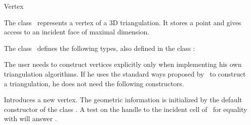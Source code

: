 

\begin{ccRefClass}{Vertex}  %


\ccDefinition
  
The class \ccRefName\ represents a vertex of a 3D triangulation. 
It stores a point and gives access to an incident face of 
maximal dimension.


\ccInheritsFrom
{}

\ccTypes
{}
\ccThreeToTwo
The class \ccClassTemplateName\ defines the following types, also
defined in the class :

\ccGlue
{}
\ccGlue
{}


\begin{ccAdvanced}
\ccCreation
The user needs to construct vertices explicitly only when implementing his
own triangulation algorithms. If he uses the standard ways proposed by 
\cgal\ to construct a triangulation, he does not need the following
constructors. 

{Introduces a new vertex. The geometric information is initialized by
the default constructor of the class . A test on the handle
to the incident cell of \ccVar\ for equality with  will
answer .} 


\end{ccAdvanced}
\end{ccRefClass}

